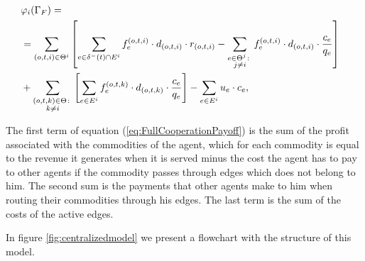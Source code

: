 \documentclass{article}
\begin{document}
\begin{enumerate}
\begin{equation}
    \hspace{-10pt}\begin{split}
    & \varphi_i(\Gamma_F) =\label{eq:FullCooperationPayoff} \\
    & = \sum_{(o,t,i)\in \Theta^i} \left[ \sum_{e \in \delta^-(t)\cap E^i} f_e^{(o,t,i)} \cdot d_{(o,t,i)} \cdot r_{(o,t,i)} -  \sum_{\substack{e\in \Theta^j \colon\\ j\not = i}} f_e^{(o,t,i)} \cdot d_{(o,t,i)} \cdot \frac{c_e}{q_e} \right]  \\
    & + \sum_{\substack{(o,t,k) \in \Theta  \colon \\ k \not = i}} \left[\sum_{e \in E^i} f_e^{(o,t,k)} \cdot d_{(o,t,k)} \cdot \frac{c_e}{q_e}\right] - \sum_{e \in E^i} u_e \cdot c_e, 
    \end{split}
\end{equation}

\end{enumerate}


The first term of equation (\ref{eq:FullCooperationPayoff}) is the sum of the profit associated with the commodities of the agent, which for each commodity is equal to the revenue it
generates when it is served minus the cost the agent has to pay to other agents if the commodity passes through edges which does not belong to him. The second sum is the payments that other agents make to him when routing their commodities through his edges. The last term is the sum of the costs of the active edges.

In figure \ref{fig:centralizedmodel} we present a flowchart with the structure of this model.
\end{document}
